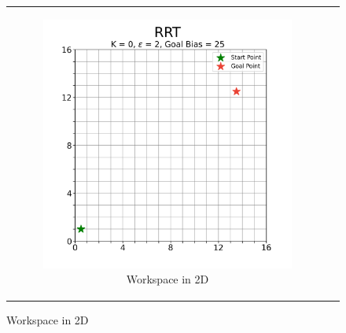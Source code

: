 
\begin{figure}[H]
\begin{centering}
\begin{tabular}{cc}

    \begin{subfigure}{0.5\linewidth}
    \includegraphics[width=\linewidth]{chapters/chapter2/img/visualizing/workspace2d.png}
    \caption{Workspace in 2D}
    \end{subfigure} &


\end{tabular}
\end{centering}
\end{figure}
